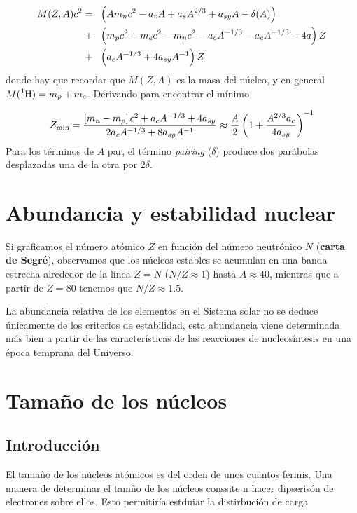 \begin{equation}
	\begin{split}
	M(Z,A)c^2  = \ & \ \left( Am_n c^2 - a_v A + a_s A^{2/3} +a_{sy} A - \delta (A) \right) \\
	 + \ & \ \left( m_p c^2 + m_e c^2 - m_n c^2 - a_c A^{-1/3} - a_cA^{-1/3} - 4a \right)Z \\
	 + \ & \ \left( a_c A^{-1/3}+4a_{sy}A^{-1} \right)Z
	\end{split}
\end{equation}
donde hay que recordar que $M(Z,A)$ es la masa del núcleo, y en general $M(\ce{^1H})=m_p+m_e$. Derivando para encontrar el mínimo

\begin{eqnarray}
	Z_{\min} = \frac{\left[ m_n - m_p \right]c^2 + a_c A^{-1/3}+4a_{sy}}{2a_c A^{-1/3} + 8 a_{sy} A^{-1}} \approx \frac{A}{2} \left( 1+\frac{A^{2/3}a_c}{4a_{sy}} \right)^{-1}
\end{eqnarray}
Para los términos de $A$ par, el término \textit{pairing} ($\delta$) produce dos parábolas desplazadas una de la otra por $2\delta$. 


\section{Abundancia y estabilidad nuclear}

Si graficamos el número atómico $Z$ en función del número neutrónico $N$ (\textbf{carta de Segré}), observamos que los núcleos estables se acumulan en una banda estrecha alrededor de la línea $Z=N$ ($N/Z\approx 1$) hasta $A\approx 40$, mientras que a partir de $Z=80$ tenemos que $N/Z\approx 1.5$.

La abundancia relativa de los elementos en el Sistema solar no se deduce únicamente de los criterios de estabilidad, esta abundancia viene determinada más bien a partir de las características de las reacciones de nucleosíntesis en una época temprana del Universo. 

\section{Tamaño de los núcleos}

\subsection{Introducción}

El tamaño de los núcleos atómicos es del orden de unos cuantos fermis. Una manera de determinar el tamño de los núcleos conssite n hacer dipserisón de electrones sobre ellos. Esto permitiría estduiar la distirbución de carga 


